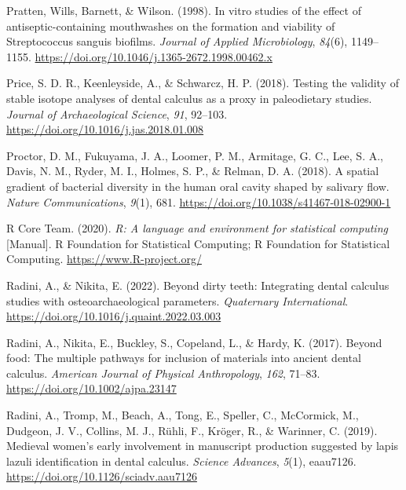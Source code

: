 \documentclass[
  letterpaper,
]{book}
\newlength{\cslhangindent}
\newlength{\cslentryspacingunit} %
\newenvironment{CSLReferences}[2] %
 {%
  \setlength{\parindent}{0pt}
  \ifodd #1
  \let\oldpar\par
  \def\par{\hangindent=\cslhangindent\oldpar}
  \fi
  \setlength{\parskip}{#2\cslentryspacingunit}
 }%
 {}
\begin{document}
\begin{CSLReferences}{1}{0}
\leavevmode{}%
Pratten, Wills, Barnett, \& Wilson. (1998). In vitro studies of the
effect of antiseptic-containing mouthwashes on the formation and
viability of {Streptococcus} sanguis biofilms. \emph{Journal of Applied
Microbiology}, \emph{84}(6), 1149--1155.
\url{https://doi.org/10.1046/j.1365-2672.1998.00462.x}

\leavevmode{}%
Price, S. D. R., Keenleyside, A., \& Schwarcz, H. P. (2018). Testing the
validity of stable isotope analyses of dental calculus as a proxy in
paleodietary studies. \emph{Journal of Archaeological Science},
\emph{91}, 92--103. \url{https://doi.org/10.1016/j.jas.2018.01.008}

\leavevmode{}%
Proctor, D. M., Fukuyama, J. A., Loomer, P. M., Armitage, G. C., Lee, S.
A., Davis, N. M., Ryder, M. I., Holmes, S. P., \& Relman, D. A. (2018).
A spatial gradient of bacterial diversity in the human oral cavity
shaped by salivary flow. \emph{Nature Communications}, \emph{9}(1), 681.
\url{https://doi.org/10.1038/s41467-018-02900-1}

\leavevmode{}%
R Core Team. (2020). \emph{R: {A} language and environment for
statistical computing} {[}Manual{]}. {R Foundation for Statistical
Computing}; {R Foundation for Statistical Computing}.
\url{https://www.R-project.org/}

\leavevmode{}%
Radini, A., \& Nikita, E. (2022). Beyond dirty teeth: {Integrating}
dental calculus studies with osteoarchaeological parameters.
\emph{Quaternary International}.
\url{https://doi.org/10.1016/j.quaint.2022.03.003}

\leavevmode{}%
Radini, A., Nikita, E., Buckley, S., Copeland, L., \& Hardy, K. (2017).
Beyond food: {The} multiple pathways for inclusion of materials into
ancient dental calculus. \emph{American Journal of Physical
Anthropology}, \emph{162}, 71--83.
\url{https://doi.org/10.1002/ajpa.23147}

\leavevmode{}%
Radini, A., Tromp, M., Beach, A., Tong, E., Speller, C., McCormick, M.,
Dudgeon, J. V., Collins, M. J., Rühli, F., Kröger, R., \& Warinner, C.
(2019). Medieval women's early involvement in manuscript production
suggested by lapis lazuli identification in dental calculus.
\emph{Science Advances}, \emph{5}(1), eaau7126.
\url{https://doi.org/10.1126/sciadv.aau7126}


\end{CSLReferences}
\end{document}
